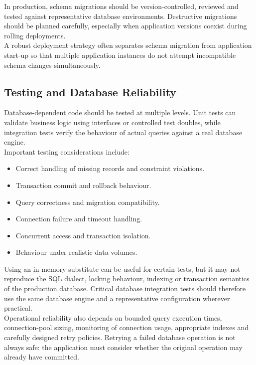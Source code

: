 In production, schema migrations should be version-controlled, reviewed and tested against representative database environments. Destructive migrations should be planned carefully, especially when application versions coexist during rolling deployments.\\

A robust deployment strategy often separates schema migration from application start-up so that multiple application instances do not attempt incompatible schema changes simultaneously.\\

\subsection{Testing and Database Reliability}

Database-dependent code should be tested at multiple levels. Unit tests can validate business logic using interfaces or controlled test doubles, while integration tests verify the behaviour of actual queries against a real database engine.\\

Important testing considerations include:

\begin{itemize}
    \item Correct handling of missing records and constraint violations.
    \item Transaction commit and rollback behaviour.
    \item Query correctness and migration compatibility.
    \item Connection failure and timeout handling.
    \item Concurrent access and transaction isolation.
    \item Behaviour under realistic data volumes.
\end{itemize}

Using an in-memory substitute can be useful for certain tests, but it may not reproduce the SQL dialect, locking behaviour, indexing or transaction semantics of the production database. Critical database integration tests should therefore use the same database engine and a representative configuration wherever practical.\\

Operational reliability also depends on bounded query execution times, connection-pool sizing, monitoring of connection usage, appropriate indexes and carefully designed retry policies. Retrying a failed database operation is not always safe: the application must consider whether the original operation may already have committed.

